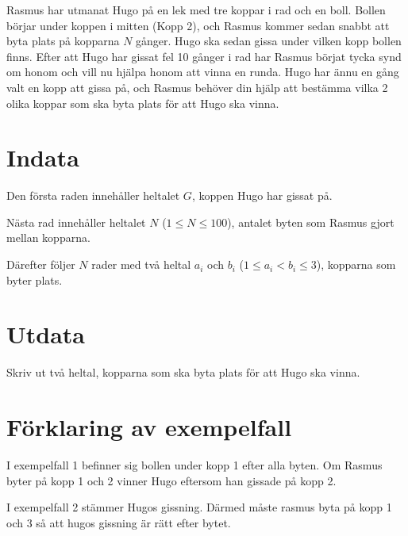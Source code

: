 
Rasmus har utmanat Hugo på en lek med tre koppar i rad och en boll. Bollen börjar under koppen i
mitten (Kopp 2), och Rasmus kommer sedan snabbt att byta plats på kopparna $N$ gånger.
Hugo ska sedan gissa under vilken kopp bollen finns. Efter att Hugo har gissat fel 10 gånger i rad
har Rasmus börjat tycka synd om honom och vill nu hjälpa honom att vinna en runda.
Hugo har ännu en gång valt en kopp att gissa på, och Rasmus behöver din hjälp att bestämma vilka
2 olika koppar som ska byta plats för att Hugo ska vinna.

\section*{Indata}
Den första raden innehåller heltalet $G$, koppen Hugo har gissat på.

Nästa rad innehåller heltalet $N$ ($1 \le N \le 100$), antalet byten som Rasmus gjort mellan kopparna.

Därefter följer $N$ rader med två heltal $a_i$ och $b_i$ ($1 \le a_i < b_i \le 3$), kopparna som byter plats.

\section*{Utdata}
Skriv ut två heltal, kopparna som ska byta plats för att Hugo ska vinna.


\section*{Förklaring av exempelfall}
I exempelfall 1 befinner sig bollen under kopp 1 efter alla byten. Om Rasmus byter på kopp 1 och 2 vinner
Hugo eftersom han gissade på kopp 2.

I exempelfall 2 stämmer Hugos gissning. Därmed måste rasmus byta på kopp 1 och 3 så att hugos gissning
är rätt efter bytet.
